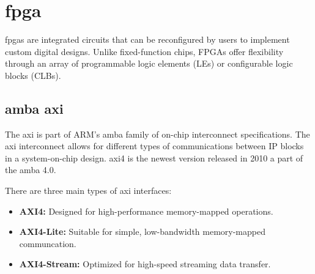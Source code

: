 

\section{\acrfull{fpga}}
\acrshort{fpga}s are integrated circuits that can be reconfigured by users to implement custom digital designs. Unlike fixed-function chips, FPGAs offer flexibility through an array of programmable logic elements (LEs) or configurable logic blocks (CLBs).







% 
% 

\subsection{\acrshort{amba} \acrshort{axi}}
The \acrfull{axi} is part of ARM's \acrfull{amba} family of on-chip interconnect specifications. The \acrshort{axi} interconnect allows for different types of communications between IP blocks in a system-on-chip design. \acrshort{axi}4 is the newest version released in 2010 a part of the \acrshort{amba} 4.0.

\noindent There are three main types of \acrshort{axi} interfaces:
\begin{itemize}
    \item \textbf{AXI4:} Designed for high-performance memory-mapped operations. 
    \item \textbf{AXI4-Lite:} Suitable for simple, low-bandwidth memory-mapped communcation.
    \item \textbf{AXI4-Stream:} Optimized for high-speed streaming data transfer.
\end{itemize}

